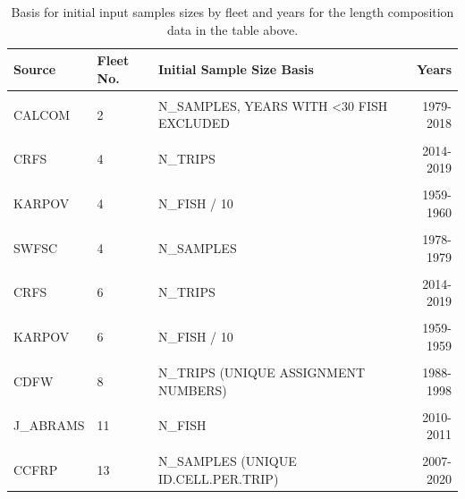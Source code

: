 \documentclass[11pt,
  english,
]{article}
\begin{document}
\begin{table}

\caption{\label{tab:length-inputN}Basis for initial input samples sizes by fleet and years for the length composition data in the table above.}
\centering
\fontsize{10}{12}\selectfont
\begin{tabular}[t]{lllr}
\toprule
Source & Fleet No. & Initial Sample Size Basis & Years\\
\midrule
\cellcolor{gray!6}{CALCOM} & \cellcolor{gray!6}{1} & \cellcolor{gray!6}{N\_SAMPLES, YEARS WITH <30 FISH EXCLUDED} & \cellcolor{gray!6}{1978-2020}\\
CALCOM & 2 & N\_SAMPLES, YEARS WITH <30 FISH EXCLUDED & 1979-2018\\
\cellcolor{gray!6}{CALCOM} & \cellcolor{gray!6}{3} & \cellcolor{gray!6}{N\_SAMPLES, YEARS WITH <30 FISH EXCLUDED} & \cellcolor{gray!6}{1987-1998}\\
CRFS & 4 & N\_TRIPS & 2014-2019\\
\cellcolor{gray!6}{CRFS} & \cellcolor{gray!6}{4} & \cellcolor{gray!6}{N\_TRIPS ESTIMATED FROM AVG. FISH/TRIP} & \cellcolor{gray!6}{2004-2013}\\
KARPOV & 4 & N\_FISH / 10 & 1959-1960\\
\cellcolor{gray!6}{MRFSS} & \cellcolor{gray!6}{4} & \cellcolor{gray!6}{N\_TRIPS ESTIMATED FROM B. SOPER ALGORITHM} & \cellcolor{gray!6}{1980-2003}\\
SWFSC & 4 & N\_SAMPLES & 1978-1979\\
\cellcolor{gray!6}{CRFS} & \cellcolor{gray!6}{5} & \cellcolor{gray!6}{N\_FISH, YEARS WITH <10 FISH EXCLUDED} & \cellcolor{gray!6}{2003-2019}\\
CRFS & 6 & N\_TRIPS & 2014-2019\\
\cellcolor{gray!6}{CRFS} & \cellcolor{gray!6}{6} & \cellcolor{gray!6}{N\_TRIPS ESTIMATED FROM AVG. FISH/TRIP} & \cellcolor{gray!6}{2004-2013}\\
KARPOV & 6 & N\_FISH / 10 & 1959-1959\\
\cellcolor{gray!6}{MRFSS} & \cellcolor{gray!6}{6} & \cellcolor{gray!6}{N\_TRIPS ESTIMATED FROM B. SOPER ALGORITHM} & \cellcolor{gray!6}{1980-2003}\\
CDFW & 8 & N\_TRIPS (UNIQUE ASSIGNMENT NUMBERS) & 1988-1998\\
\cellcolor{gray!6}{NWFSC} & \cellcolor{gray!6}{9} & \cellcolor{gray!6}{EFFECTIVE N  BASED ON STEWART \& HAMEL (2014)} & \cellcolor{gray!6}{2003-2019}\\
J\_ABRAMS & 11 & N\_FISH & 2010-2011\\
\cellcolor{gray!6}{SWFSC} & \cellcolor{gray!6}{12} & \cellcolor{gray!6}{N\_SAMPLES (NUMBER OF HAULS)} & \cellcolor{gray!6}{2002-2016}\\
CCFRP & 13 & N\_SAMPLES (UNIQUE ID.CELL.PER.TRIP) & 2007-2020\\
\bottomrule
\end{tabular}
\end{table}
\end{document}
